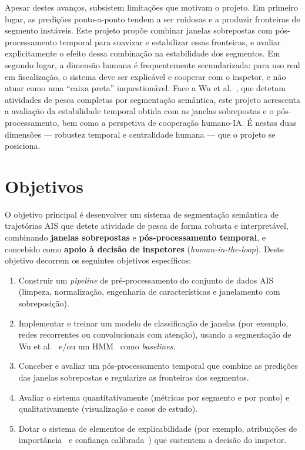 \documentclass{article}
\begin{document}
Apesar destes avan\c{c}os, subsistem limita\c{c}\~oes que motivam o projeto. Em primeiro
lugar, as predi\c{c}\~oes ponto-a-ponto tendem a ser ruidosas e a produzir fronteiras de
segmento inst\'aveis. Este projeto prop\~oe combinar janelas sobrepostas com
p\'os-processamento temporal para suavizar e estabilizar essas fronteiras, e avaliar
explicitamente o efeito dessa combina\c{c}\~ao na estabilidade dos segmentos. Em segundo
lugar, a dimens\~ao humana \'e frequentemente secundarizada: para uso real em
fiscaliza\c{c}\~ao, o sistema deve ser explic\'avel e cooperar com o inspetor, e n\~ao
atuar como uma ``caixa preta'' inquestion\'avel. Face a Wu et al.~\cite{wu2022}, que
detetam atividades de pesca completas por segmenta\c{c}\~ao sem\^antica, este projeto
acrescenta a avalia\c{c}\~ao da estabilidade temporal obtida com as janelas sobrepostas e
o p\'os-processamento, bem como a perspetiva de coopera\c{c}\~ao humano-IA. \'E nestas
duas dimens\~oes --- robustez temporal e centralidade humana --- que o projeto se
posiciona.

\section{Objetivos}
\label{sec:objetivos}

O objetivo principal \'e desenvolver um sistema de segmenta\c{c}\~ao sem\^antica de
trajet\'orias AIS que detete atividade de pesca de forma robusta e interpret\'avel,
combinando \textbf{janelas sobrepostas} e \textbf{p\'os-processamento temporal}, e
concebido como \textbf{apoio \`a decis\~ao de inspetores} (\emph{human-in-the-loop}).
Deste objetivo decorrem os seguintes objetivos espec\'ificos:

\begin{enumerate}
    \item Construir um \emph{pipeline} de pr\'e-processamento do conjunto de dados AIS
    (limpeza, normaliza\c{c}\~ao, engenharia de caracter\'isticas e janelamento com
    sobreposi\c{c}\~ao).
    \item Implementar e treinar um modelo de classifica\c{c}\~ao de janelas (por exemplo,
     redes recorrentes ou convolucionais com aten\c{c}\~ao), usando a segmenta\c{c}\~ao de
     Wu et al.~\cite{wu2022} e/ou um HMM~\cite{peel2011} como \emph{baselines}.
    \item Conceber e avaliar um p\'os-processamento temporal que combine as predi\c{c}\~oes
    das janelas sobrepostas e regularize as fronteiras dos segmentos.
    \item Avaliar o sistema quantitativamente (m\'etricas por segmento e por ponto) e
    qualitativamente (visualiza\c{c}\~ao e casos de estudo).
    \item Dotar o sistema de elementos de explicabilidade (por exemplo, atribui\c{c}\~oes de
    import\^ancia~\cite{lundberg2017} e confian\c{c}a calibrada~\cite{guo2017}) que sustentem a
    decis\~ao do inspetor.
\end{enumerate}
\end{document}
